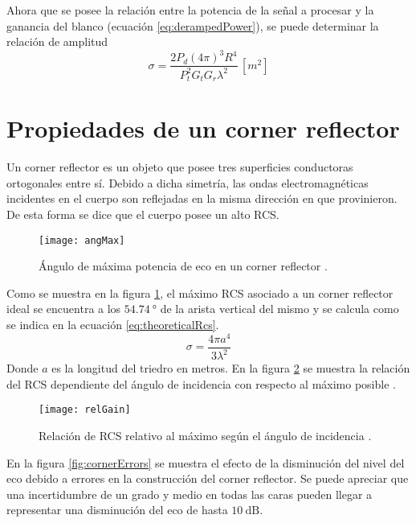 Ahora que se posee la relación entre la potencia de la señal a procesar y la ganancia del blanco (ecuación \ref{eq:derampedPower}), se puede determinar la relación de amplitud
\begin{equation}
  \sigma = \dfrac{2P_d(4\pi)^3 R^4}{P_t^2G_tG_r\lambda^2} \,[\si{m^2}]
\end{equation}


\section{Propiedades de un corner reflector}

Un corner reflector es un objeto que posee tres superficies conductoras ortogonales entre sí. Debido a dicha simetría, las ondas electromagnéticas incidentes en el cuerpo son reflejadas en la misma dirección en que provinieron. De esta forma se dice que el cuerpo posee un alto RCS.

\begin{figure}[H]
 \centering
 \texttt{[image: angMax]}
 \caption{Ángulo de máxima potencia de eco en un corner reflector \cite{Michelson1993}.}
 \label{fig:cornerMax}
\end{figure}

Como se muestra en la figura \ref{fig:cornerMax}, el máximo RCS asociado a un corner reflector ideal se encuentra a los $\SI{54.74}{\degree}$ de la arista vertical del mismo y se calcula como se indica en la ecuación \ref{eq:theoreticalRcs}.
\begin{equation} \label{eq:theoreticalRcs}
  \sigma = \dfrac{4\pi a^4}{3\lambda^2}
\end{equation}
Donde $a$ es la longitud del triedro en metros. En la figura \ref{fig:cornerRel} se muestra la relación del RCS dependiente del ángulo de incidencia con respecto al máximo posible \cite{Michelson1993}.

\begin{figure}[H]
 \centering
 \texttt{[image: relGain]}
 \caption{Relación de RCS relativo al máximo según el ángulo de incidencia \cite{Michelson1993}.}
 \label{fig:cornerRel}
\end{figure}

En la figura \ref{fig:cornerErrors} se muestra el efecto de la disminución del nivel del eco debido a errores en la construcción del corner reflector. Se puede apreciar que una incertidumbre de un grado y medio en todas las caras pueden llegar a representar una disminución del eco de hasta $\SI{10}{\dB}$.

